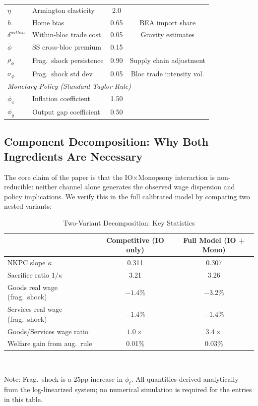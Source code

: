\begin{table}[htbp]
\begin{tabular}{llcc}
    $\eta$ & Armington elasticity & 2.0 & \citet{arkolakis2012} \\
    $h$ & Home bias & 0.65 & BEA import share \\
    $\delta^{within}$ & Within-bloc trade cost & 0.05 & Gravity estimates \\
    $\bar\phi$ & SS cross-bloc premium & 0.15 & \citet{aiyar2023} \\
    $\rho_\phi$ & Frag.\ shock persistence & 0.90 & Supply chain adjustment \\
    $\sigma_\phi$ & Frag.\ shock std dev & 0.05 & Bloc trade intensity vol. \\
    \midrule
    \multicolumn{4}{l}{\textit{Monetary Policy (Standard Taylor Rule)}} \\
    $\phi_\pi$ & Inflation coefficient & 1.50 & \citet{clarida1999} \\
    $\phi_y$ & Output gap coefficient & 0.50 & \citet{clarida1999} \\
    \bottomrule
  \end{tabular}
\end{table}

\subsection{Component Decomposition: Why Both Ingredients Are Necessary}
\label{sec:decomposition}

The core claim of the paper is that the IO$\times$Monopsony interaction
is non-reducible: neither channel alone generates the observed wage
dispersion and policy implications. We verify this in the full calibrated
model by comparing two nested variants:

\begin{table}[htbp]
  \centering
  \caption{Two-Variant Decomposition: Key Statistics}
  \label{tab:decomp}
  \footnotesize
  \begin{tabular}{lcc}
    \toprule
    & \textbf{Competitive (IO only)} & \textbf{Full Model (IO + Mono)} \\
    \midrule
    NKPC slope $\kappa$               & 0.311 & 0.307 \\
    Sacrifice ratio $1/\kappa$        & 3.21  & 3.26  \\
    Goods real wage (frag.\ shock)    & $-1.4\%$ & $-3.2\%$ \\
    Services real wage (frag.\ shock) & $-1.4\%$ & $-1.4\%$ \\
    Goods/Services wage ratio         & $1.0\times$ & $3.4\times$ \\
    Welfare gain from aug.\ rule      & 0.01\% & 0.03\% \\
    \bottomrule
  \end{tabular}\\[4pt]
  \raggedright\footnotesize
  Note: Frag.\ shock is a 25pp increase in $\phi_t$. All quantities
  derived analytically from the log-linearized system; no numerical
  simulation is required for the entries in this table.
\end{table}

